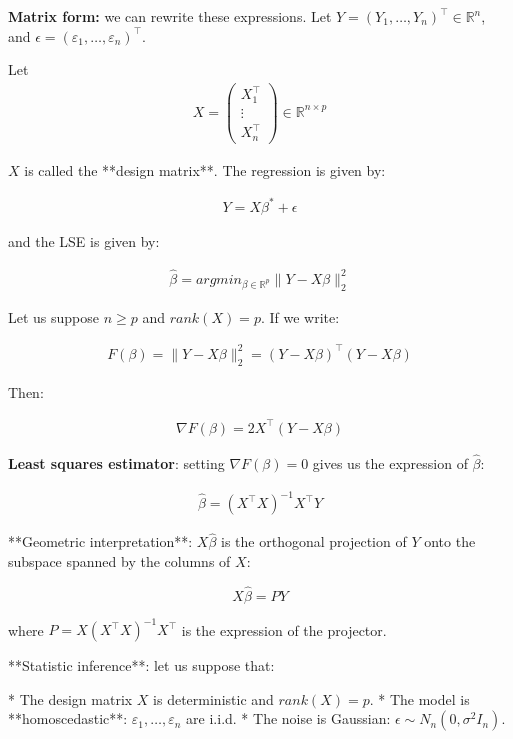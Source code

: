\textbf{Matrix form:} we can rewrite these expressions. Let $Y = (Y_1, \ldots, Y_n)^\top \in \mathbb{R}^n$, and $\epsilon = (\varepsilon_1, \ldots, \varepsilon_n)^\top$. 

Let
\begin{align*}
X = \begin{pmatrix} X_1^\top \\ \vdots \\ X_n^\top \end{pmatrix} \in \mathbb{R}^{n \times p}
\end{align*}

$X$ is called the **design matrix**. The regression is given by:

\begin{align*}
Y = X\beta^{*} + \epsilon
\end{align*}

and the LSE is given by:

\begin{align*}
\hat{\beta} = argmin_{\beta \in \mathbb{R}^p} \|Y - X\beta\|^2_2
\end{align*}


Let us suppose $n \geq p$ and $rank(X) = p$. If we write:

\begin{align*}
F(\beta)  = \|Y - X\beta\|^2_2 = (Y - X\beta)^\top(Y - X\beta)
\end{align*}


Then:

\begin{align*}
\nabla F(\beta) = 2 X^\top(Y - X\beta)
\end{align*}


\textbf{Least squares estimator}: setting $\nabla F(\beta) = 0$ gives us the expression of $\hat{\beta}$:

\begin{align*}
\hat{\beta} = (X^\top X)^{-1}X^\top Y
\end{align*}


**Geometric interpretation**: $X\hat{\beta}$ is the orthogonal projection of $Y$ onto the subspace spanned by the columns of $X$:

$$ X\hat{\beta} = PY$$

where $P = X(X^\top X)^{-1}X^\top$ is the expression of the projector.

**Statistic inference**: let us suppose that:

* The design matrix $X$ is deterministic and $rank(X) = p$.
* The model is **homoscedastic**: $\varepsilon_1, \ldots, \varepsilon_n$ are i.i.d.
* The noise is Gaussian: $\epsilon \sim N_n(0, \sigma^2I_n)$.


